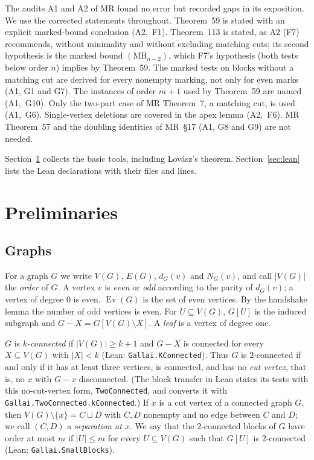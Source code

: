 \documentclass[11pt]{amsart}
\theoremstyle{definition}
\theoremstyle{remark}
\renewcommand{\_}{\oldunderscore\allowbreak}
\newcommand{\lean}[1]{\textup{(Lean: {\small\texttt{#1}})}}
\newcommand{\MBU}{\mathrm{MB}}
\newcommand{\Ev}{\operatorname{Ev}}
\begin{document}
The audits A1 and A2 of MR found no error but recorded gaps in its exposition. We use the corrected
statements throughout. Theorem~59 is stated with an explicit marked-bound conclusion (A2,~F1).
Theorem~113 is stated, as A2 (F7) recommends, without minimality and without excluding matching
cuts; its second hypothesis is the marked bound $(\MBU_{n-2})$, which F7's hypothesis (both tests
below order $n$) implies by Theorem~59. The marked tests on blocks
without a matching cut are derived for every nonempty marking, not only for even marks (A1, G1 and
G7). The instances of order $m+1$ used by Theorem~59 are named (A1,~G10). Only the two-part case of
MR Theorem~7, a matching cut, is used (A1,~G6). Single-vertex deletions are covered in the apex lemma
(A2,~F6). MR Theorem~57 and the doubling identities of MR~\S17 (A1, G8 and G9) are not needed.

Section~\ref{sec:prelim} collects the basic tools, including Lov\'asz's theorem.
Section~\ref{sec:lean} lists the Lean declarations with their files and lines.

\section{Preliminaries}\label{sec:prelim}

\subsection{Graphs}
For a graph $G$ we write $V(G)$, $E(G)$, $d_G(v)$ and $N_G(v)$, and call $|V(G)|$ the
\emph{order} of $G$. A vertex $v$ is \emph{even} or \emph{odd} according to the parity of $d_G(v)$;
a vertex of degree $0$ is even. $\Ev(G)$ is the set of even vertices. By the handshake lemma the
number of odd vertices is even. For $U\subseteq V(G)$, $G[U]$ is the induced subgraph and
$G-X=G[V(G)\setminus X]$. A \emph{leaf} is a vertex of degree one.

$G$ is \emph{$k$-connected} if $|V(G)|\ge k+1$ and $G-X$ is connected for every $X\subseteq V(G)$
with $|X|<k$ \lean{Gallai.KConnected}. Thus $G$ is $2$-connected if and only if it has at least three
vertices, is connected, and has no \emph{cut vertex}, that is, no $x$ with $G-x$ disconnected. (The
block transfer in Lean states its tests with this no-cut-vertex form, \texttt{TwoConnected}, and
converts it with \texttt{Gallai.TwoConnected.kConnected}.) If
$x$ is a cut vertex of a connected graph $G$, then $V(G)\setminus\{x\}=C\sqcup D$ with $C,D$
nonempty and no edge between $C$ and $D$; we call $(C,D)$ a \emph{separation at $x$}. We say that
the $2$-connected blocks of $G$ have order at most $m$ if $|U|\le m$ for every $U\subseteq V(G)$ such
that $G[U]$ is $2$-connected \lean{Gallai.SmallBlocks}.
\end{document}
